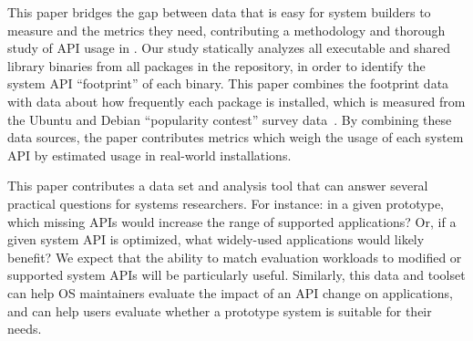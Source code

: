 This paper bridges the gap between 
data that is easy for system builders to measure and the 
metrics they need, contributing 
 a methodology and thorough study of API usage in \osarch{} \osdist{}.
Our study statically analyzes all executable and shared library binaries from all
\packagenum{} packages in the \osdist{} repository, in order
to identify the system API ``footprint'' of each binary.
This paper combines the footprint data with data about how frequently 
each package is installed, which is measured from the Ubuntu and Debian ``popularity contest'' survey data~\citep{ubuntu-popularity, debian-popularity}.
By combining these data sources, the paper contributes metrics
which weigh the usage of each system API by estimated usage in real-world installations.





This paper contributes a data set and analysis tool
that can answer several practical questions for systems researchers.
For instance: in a given prototype, which missing APIs would increase the range of supported applications?
Or, if a given system API is optimized, what widely-used applications
would likely benefit?  We expect that the ability to match evaluation workloads to modified or supported system APIs
will be particularly useful.  
Similarly, this data and toolset can help 
OS maintainers evaluate the impact of an API change on applications, and can help users
evaluate whether a prototype system is suitable for their needs.

